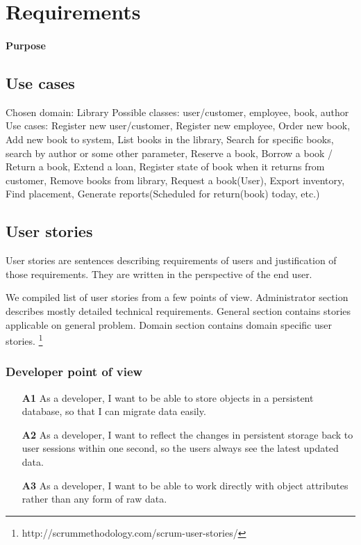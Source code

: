 \chapter{Requirements}

\minitoc

\subsubsection{Purpose}

\clearpage

\section{Use cases}
Chosen domain: Library
Possible classes: user/customer, employee, book, author
Use cases: Register new user/customer, Register new employee, Order new book, Add new book to system, List books in the library, Search for specific books, search by author or some other parameter, Reserve a book, Borrow a book / Return a book, Extend a loan, Register state of book when it returns from customer, Remove books from library, Request a book(User), Export inventory, Find placement, Generate reports(Scheduled for return(book) today, etc.)

\section{User stories}
User stories are sentences describing requirements of users and justification of those requirements. They are written in the perspective of the end user.


We compiled list of user stories from a few points of view. Administrator section describes mostly detailed technical requirements. General section contains stories applicable on general problem. Domain section contains domain specific user stories. \footnote{http://scrummethodology.com/scrum-user-stories/}

\subsection*{Developer point of view}
\begin{itemize}
  \item [\textbf{A1}] As a developer, I want to be able to store objects in a persistent database, so that I can migrate data easily.
  \item [\textbf{A2}] As a developer, I want to reflect the changes in persistent storage back to user sessions within one second, so the users always see the latest updated data.
  \item [\textbf{A3}] As a developer, I want to be able to work directly with object attributes rather than any form of raw data.
\end{itemize}

